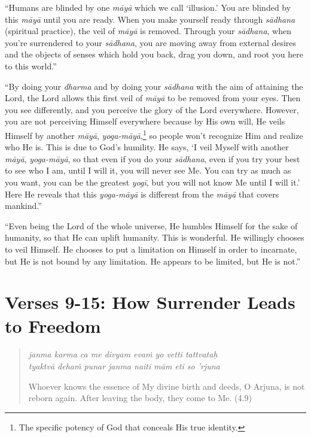 \documentclass[12pt, twoside, openright]{memoir}
\begin{document}
\enquote{Humans are blinded by one \textit{māyā} which we call \enquote{illusion.} You are blinded by this \textit{māyā} until you are ready. When you make yourself ready through \textit{sādhana} (spiritual practice), the veil of \textit{māyā} is removed. Through your \textit{sādhana}, when you’re surrendered to your \textit{sādhana}, you are moving away from external desires and the objects of senses which hold you back, drag you down, and root you here to this world.}

\enquote{By doing your \textit{dharma} and by doing your \textit{sādhana} with the aim of attaining the Lord, the Lord allows this first veil of \textit{māyā} to be removed from your eyes. Then you see differently, and you perceive the glory of the Lord everywhere. However, you are not perceiving Himself everywhere because by His own will, He veils Himself by another \textit{māyā}, \textit{yoga-māyā},\footnote{The specific potency of God that conceals His true identity.} so people won’t recognize Him and realize who He is. This is due to God’s humility. He says, \enquote{I veil Myself with another \textit{māyā}, \textit{yoga-māyā}, so that even if you do your \textit{sādhana}, even if you try your best to see who I am, until I will it, you will never see Me. You can try as much as you want, you can be the greatest \textit{yogī}, but you will not know Me until I will it.} Here He reveals that this \textit{yoga-māyā} is different from the \textit{māyā} that covers mankind.}

\enquote{Even being the Lord of the whole universe, He humbles Himself for the sake of humanity, so that He can uplift humanity. This is wonderful. He willingly chooses to veil Himself. He chooses to put a limitation on Himself in order to incarnate, but He is not bound by any limitation. He appears to be limited, but He is not.}

\section{Verses 9-15: How Surrender Leads to Freedom}\label{sec-verses-9-15-how-surrender-leads-to-freedom}

\par
\begin{verse}
\textit{janma karma ca me divyam evaṁ yo vetti tattvataḥ} \\
\textit{tyaktvā dehaṁ punar janma naiti mām eti so ’rjuna}

\noindent Whoever knows the essence of My divine birth and deeds, O Arjuna, is not reborn again. After leaving the body, they come to Me. (4.9)
\end{verse}
\par
\end{document}
